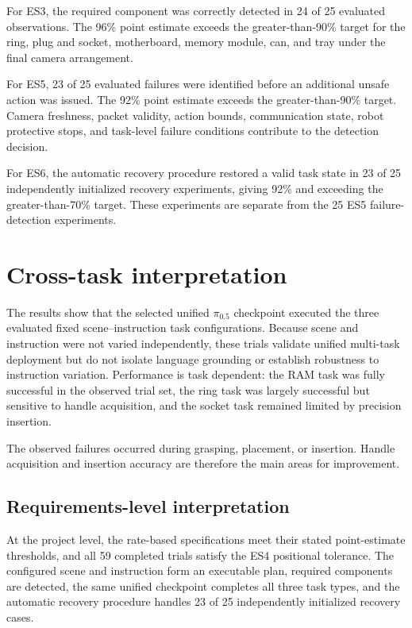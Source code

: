 For ES3, the required component was correctly detected in 24 of 25 evaluated
observations. The 96\% point estimate exceeds the greater-than-90\% target for
the ring, plug and socket, motherboard, memory module, can, and tray under the
final camera arrangement.

For ES5, 23 of 25 evaluated failures were identified before an additional
unsafe action was issued. The 92\% point estimate exceeds the
greater-than-90\% target. Camera freshness, packet validity, action bounds,
communication state, robot protective stops, and task-level failure conditions
contribute to the detection decision.

For ES6, the automatic recovery procedure restored a valid task state in 23 of
25 independently initialized recovery experiments, giving 92\% and exceeding
the greater-than-70\% target. These experiments are separate from the 25 ES5
failure-detection experiments.

\section{Cross-task interpretation}

The results show that the selected unified $\pi_{0.5}$ checkpoint executed the three evaluated fixed scene--instruction task configurations. Because scene and instruction were not varied independently, these trials validate unified multi-task deployment but do not isolate language grounding or establish robustness to instruction variation. Performance is task dependent: the RAM task was fully successful in the observed trial set, the ring task was largely successful but sensitive to handle acquisition, and the socket task remained limited by precision insertion.

The observed failures occurred during grasping, placement, or insertion. Handle acquisition and insertion accuracy are therefore the main areas for improvement.

\subsection{Requirements-level interpretation}

At the project level, the rate-based specifications meet their stated
point-estimate thresholds, and all 59 completed trials satisfy the ES4
positional tolerance. The configured scene and instruction form an executable
plan, required components are detected, the same unified checkpoint completes
all three task types, and the automatic recovery procedure handles 23 of 25
independently initialized recovery cases.

